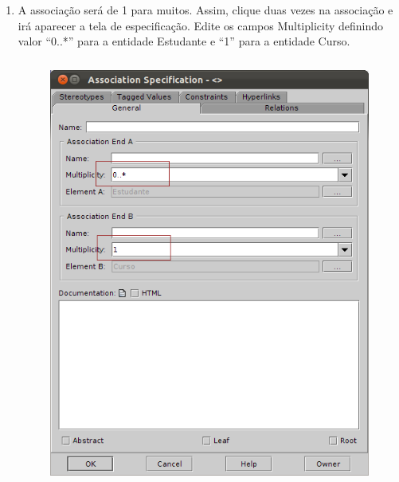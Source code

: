 \begin{enumerate}
\item A associação será de 1 para muitos. Assim, clique duas vezes na
associação e irá aparecer a tela de especificação. Edite os campos Multiplicity
definindo valor “0..*” para a entidade Estudante e “1” para a entidade Curso.
\begin{figure}[!htb]
	\centering
	\includegraphics[width=350pt,height=400pt]{imgs/tutorial-mdarte-0005.png}
\end{figure}
	

\end{enumerate}
